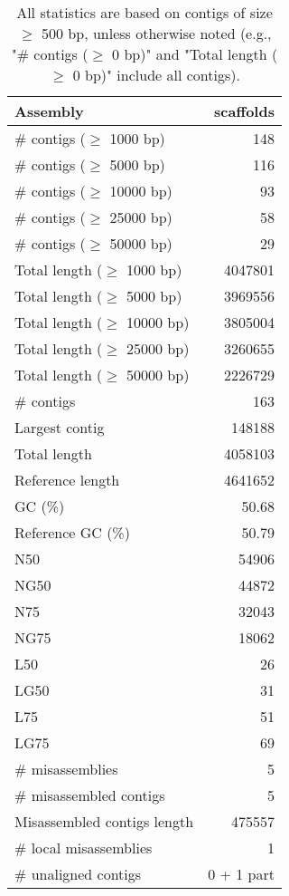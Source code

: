 \documentclass[12pt,a4paper]{article}
\begin{document}
\begin{table}[ht]
\begin{center}
\caption{All statistics are based on contigs of size $\geq$ 500 bp, unless otherwise noted (e.g., "\# contigs ($\geq$ 0 bp)" and "Total length ($\geq$ 0 bp)" include all contigs).}
\begin{tabular}{|l*{1}{|r}|}
\hline
Assembly & scaffolds \\ \hline
\# contigs ($\geq$ 1000 bp) & 148 \\ \hline
\# contigs ($\geq$ 5000 bp) & 116 \\ \hline
\# contigs ($\geq$ 10000 bp) & 93 \\ \hline
\# contigs ($\geq$ 25000 bp) & 58 \\ \hline
\# contigs ($\geq$ 50000 bp) & 29 \\ \hline
Total length ($\geq$ 1000 bp) & 4047801 \\ \hline
Total length ($\geq$ 5000 bp) & 3969556 \\ \hline
Total length ($\geq$ 10000 bp) & 3805004 \\ \hline
Total length ($\geq$ 25000 bp) & 3260655 \\ \hline
Total length ($\geq$ 50000 bp) & 2226729 \\ \hline
\# contigs & 163 \\ \hline
Largest contig & 148188 \\ \hline
Total length & 4058103 \\ \hline
Reference length & 4641652 \\ \hline
GC (\%) & 50.68 \\ \hline
Reference GC (\%) & 50.79 \\ \hline
N50 & 54906 \\ \hline
NG50 & 44872 \\ \hline
N75 & 32043 \\ \hline
NG75 & 18062 \\ \hline
L50 & 26 \\ \hline
LG50 & 31 \\ \hline
L75 & 51 \\ \hline
LG75 & 69 \\ \hline
\# misassemblies & 5 \\ \hline
\# misassembled contigs & 5 \\ \hline
Misassembled contigs length & 475557 \\ \hline
\# local misassemblies & 1 \\ \hline
\# unaligned contigs & 0 + 1 part \\ \hline

\end{tabular}
\end{center}
\end{table}
\end{document}
